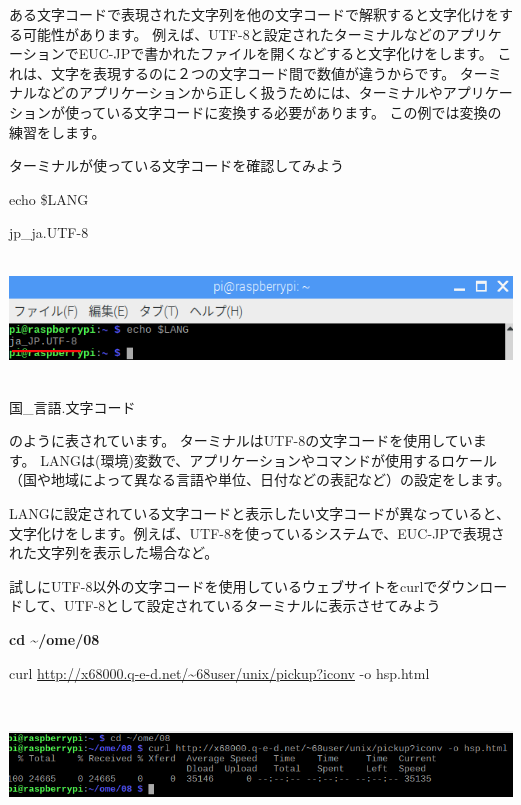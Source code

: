\documentclass[a4paper,12pt,dvipdfmx]{jarticle}
\begin{document}
ある文字コードで表現された文字列を他の文字コードで解釈すると文字化けをする可能性があります。
例えば、UTF-8と設定されたターミナルなどのアプリケーションでEUC-JPで書かれたファイルを開くなどすると文字化けをします。
これは、文字を表現するのに２つの文字コード間で数値が違うからです。
ターミナルなどのアプリケーションから正しく扱うためには、ターミナルやアプリケーションが使っている文字コードに変換する必要があります。
この例では変換の練習をします。

ターミナルが使っている文字コードを確認してみよう

echo \$LANG

jp\_ja.UTF-8

\begin{center}
\includegraphics[width=17.006cm,height=3.231cm]{textbook-img019.png}

\end{center}
国\_言語.文字コード

のように表されています。
ターミナルはUTF-8の文字コードを使用しています。
LANGは(環境)変数で、アプリケーションやコマンドが使用するロケール（国や地域によって異なる言語や単位、日付などの表記など）の設定をします。


LANGに設定されている文字コードと表示したい文字コードが異なっていると、文字化けをします。例えば、UTF-8を使っているシステムで、EUC-JPで表現された文字列を表示した場合など。


試しにUTF-8以外の文字コードを使用しているウェブサイトをcurlでダウンロードして、UTF-8として設定されているターミナルに表示させてみよう

\textbf{cd \~{}/ome/08}

curl \url{http://x68000.q-e-d.net/~68user/unix/pickup?iconv} -o hsp.html

\begin{center}
\includegraphics[width=17.006cm,height=3.53cm]{textbook-img020.png}

\end{center}
\end{document}
